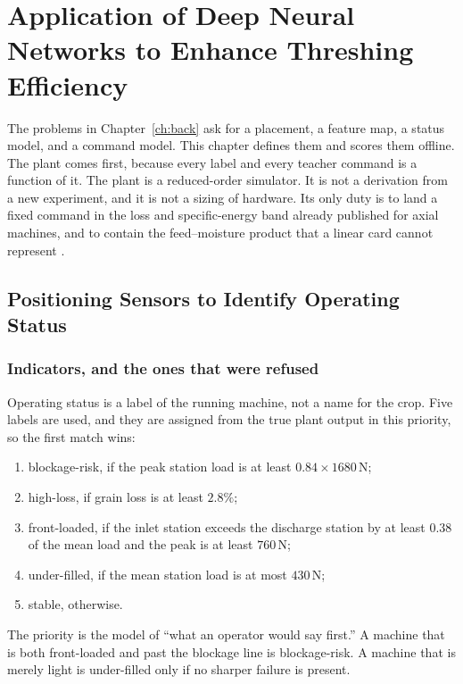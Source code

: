 \chapter{Application of Deep Neural Networks to Enhance Threshing Efficiency}
\label{ch:method}

The problems in Chapter~\ref{ch:back} ask for a placement, a feature map, a status model, and a command model. This chapter defines them and scores them offline. The plant comes first, because every label and every teacher command is a function of it. The plant is a reduced-order simulator. It is not a derivation from a new experiment, and it is not a sizing of hardware. Its only duty is to land a fixed command in the loss and specific-energy band already published for axial machines, and to contain the feed--moisture product that a linear card cannot represent \cite{miu2008a,harrison1991}.

\section{Positioning Sensors to Identify Operating Status}
\label{sec:place}

\subsection{Indicators, and the ones that were refused}

Operating status is a label of the running machine, not a name for the crop. Five labels are used, and they are assigned from the true plant output in this priority, so the first match wins:

\begin{enumerate}
\item blockage-risk, if the peak station load is at least \(0.84\times 1680\,\mathrm{N}\);
\item high-loss, if grain loss is at least \(2.8\%\);
\item front-loaded, if the inlet station exceeds the discharge station by at least \(0.38\) of the mean load and the peak is at least \(760\,\mathrm{N}\);
\item under-filled, if the mean station load is at most \(430\,\mathrm{N}\);
\item stable, otherwise.
\end{enumerate}

The priority is the model of ``what an operator would say first.'' A machine that is both front-loaded and past the blockage line is blockage-risk. A machine that is merely light is under-filled only if no sharper failure is present.

